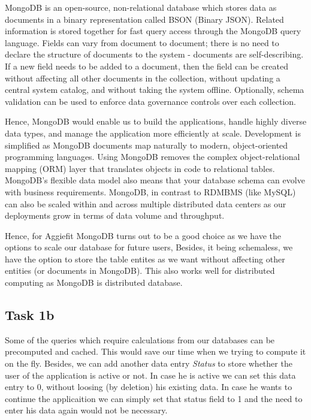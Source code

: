 \documentclass[letterpaper]{article}
\begin{document}
MongoDB is an open-source, non-relational database which stores data as documents in a binary representation called BSON (Binary JSON). Related information is stored together for fast query access through the MongoDB query language. Fields can vary from document to document; there is no need to declare the structure of documents to the system - documents are self-describing. If a new field needs to be added to a document, then the field can be created without affecting all other documents in the collection, without updating a central system catalog, and without taking the system offline. Optionally, schema validation can be used to enforce data governance controls over each collection.

Hence, MongoDB would enable us to build the applications, handle highly diverse data types, and manage the application more efficiently at scale. Development is simplified as MongoDB documents map naturally to modern, object-oriented programming languages. Using MongoDB removes the complex object-relational mapping (ORM) layer that translates objects in code to relational tables. MongoDB’s flexible data model also means that your database schema can evolve with business requirements. MongoDB, in contrast to RDMBMS (like MySQL) can also be scaled within and across multiple distributed data centers as our deployments grow in terms of data volume and throughput.

Hence, for Aggiefit MongoDB turns out to be a good choice as we have the options to scale our database for future users, Besides, it being schemaless, we have the option to store the table entites as we want without affecting other entities (or documents in MongoDB). This also works well for distributed computing as MongoDB is distributed database.  

\subsection{Task 1b}

Some of the queries which require calculations from our databases can be precomputed and cached. This would save our time when we trying to compute it on the fly. Besides, we can add another data entry \textit{Status} to store whether the user of the application is active or not. In case he is active we can set this data entry to 0, without loosing (by deletion) his existing data. In case he wants to continue the applicaition we can simply set that status field to 1 and the need to enter his data again would not be necessary.
\end{document}
